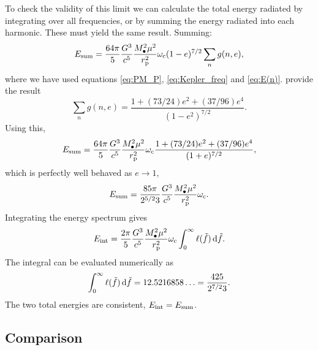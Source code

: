 To check the validity of this limit we can calculate the total energy radiated by integrating  over all frequencies, or by summing the energy radiated into each harmonic. These must yield the same result. Summing:
\begin{equation}
E_\mathrm{sum} = \dfrac{64\pi}{5}\dfrac{G^3}{c^5}\dfrac{M_\bullet^2\mu^2}{r_\mathrm{p}^2}\omega_\mathrm{c}(1-e)^{7/2}\sum_n g(n,e),
\end{equation}
where we have used equations \eqref{eq:PM_P}, \eqref{eq:Kepler_freq} and \eqref{eq:E(n)}. \citet{Peters1963} provide the result
\begin{equation}
\sum_n g(n,e) = \dfrac{1 + (73/24)e^2 + (37/96)e^4}{(1-e^2)^{7/2}}.
\end{equation}
Using this,
\begin{equation}
E_\mathrm{sum} = \dfrac{64\pi}{5}\dfrac{G^3}{c^5}\dfrac{M_\bullet^2\mu^2}{r_\mathrm{p}^2}\omega_\mathrm{c}\dfrac{1 + (73/24)e^2 + (37/96)e^4}{(1+e)^{7/2}},
\end{equation}
which is perfectly well behaved as $e \rightarrow 1$,
\begin{equation}
E_\mathrm{sum} = \dfrac{85\pi}{2^{5/2}3}\dfrac{G^3}{c^5}\dfrac{M_\bullet^2\mu^2}{r_\mathrm{p}^2}\omega_\mathrm{c}.
\label{eq:PM_total}
\end{equation}
Integrating the energy spectrum  gives
\begin{equation}
E_\mathrm{int} = \dfrac{2\pi}{5}\dfrac{G^3}{c^5}\dfrac{M_\bullet^2\mu^2}{r_\mathrm{p}^2}\omega_\mathrm{c}\int_{0}^{\infty}{\ell(\tilde{f})}\,\mathrm{d}{\tilde{f}}.
\end{equation}
The integral can be evaluated numerically as
\begin{equation}
\int_{0}^{\infty}{\ell(\tilde{f})}\,\mathrm{d}{\tilde{f}} = 12.5216858\ldots = \dfrac{425}{2^{7/2}3}.
\end{equation}
The two total energies are consistent, $E_\mathrm{int} = E_\mathrm{sum}$.

\subsection{Comparison}

